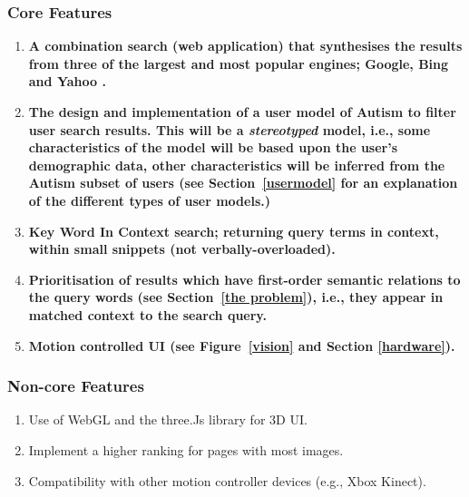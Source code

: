 \documentclass[a4paper, 11pt]{article}
\begin{document}
\begin{justify}
\subsubsection{Core Features}\label{core}
\begin{enumerate}
\item  \textbf{A combination search (web application) that synthesises the results from three of the largest and most popular engines; Google, Bing and Yahoo \cite{adam}.}

\item \textbf{The design and implementation of a user model of Autism to filter user search results. This will be a \textit{stereotyped} model, i.e., some characteristics of the model will be based upon the user's demographic data, other characteristics will be inferred from the Autism subset of users (see Section~\ref{usermodel} for an explanation of the different types of user models.)}

\item \textbf{Key Word In Context search; returning query terms in context, within small snippets (not verbally-overloaded).}

\item \textbf{Prioritisation of results which have first-order semantic relations to the query words (see Section~\ref{the problem}), i.e., they appear in matched context to the search query.}

\item \textbf{Motion controlled UI (see Figure~\ref{vision} and Section \ref{hardware}).}
\end{enumerate}

\subsubsection{Non-core Features}
\begin{enumerate}
\item Use of WebGL and the three.Js library for 3D UI.
\item Implement a higher ranking for pages with most images. 
\item Compatibility with other motion controller devices (e.g., Xbox Kinect).

\end{enumerate}


\end{justify}
\end{document}
